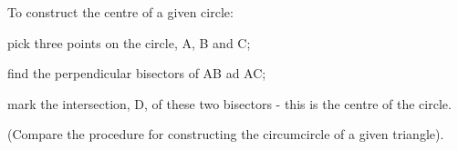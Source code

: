 To construct the centre of a given circle:
\par
pick three points on the circle, A, B and C;
\par
find the perpendicular bisectors of AB ad AC;
\par
mark the intersection, D, of these two bisectors - this is the 
centre of the circle.
\par
(Compare the procedure for constructing the circumcircle of a given triangle).